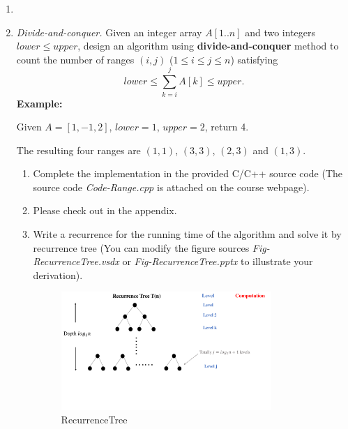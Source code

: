 \documentclass[12pt,a4paper]{article}
\makeatletter
\newtheorem*{solution}{Solution}
\theoremstyle{definition}
\renewenvironment{solution}[1][Solution] {\par\pushQED{\qed}\normalfont\topsep6\p@\@plus6\p@\relax\trivlist\item[\hskip\labelsep\bfseries#1\@addpunct{.}]\ignorespaces}{\popQED\endtrivlist\@endpefalse} \makeatother
\makeatother
\begin{document}
\begin{enumerate}
\begin{solution}
	
\end{solution}
\item
\textit{Divide-and-conquer.} Given an integer array $A[1..n]$ and two integers $lower \le upper$, design an algorithm using \textbf{divide-and-conquer} method to count the number of ranges $(i,j)$ ($1 \leq i \leq j \leq n$) satisfying
$$
    lower \leq \sum_{k=i}^{j}{A[k]} \leq upper.
$$
\textbf{Example:}

Given $A = [1,-1,2]$, $lower = 1$, $upper = 2$, return 4.

The resulting four ranges are $(1,1)$, $(3,3)$, $(2,3)$ and $(1,3)$.

\begin{enumerate}
\item
Complete the implementation in the provided C/C++ source code {\color{blue}(The source code \emph{Code-Range.cpp} is attached on the course webpage)}.

\begin{solution}
Please check out in the appendix.
\end{solution}

\item
Write a recurrence for the running time of the algorithm and solve it by recurrence tree {\color{blue}(You can modify the figure sources \emph{Fig-RecurrenceTree.vsdx} or \emph{Fig-RecurrenceTree.pptx} to illustrate your derivation)}.


\begin{figure}[the]
    \centering
    \includegraphics[width=0.8\textwidth]{Fig-RecurrenceTree2.pdf}
    \caption{RecurrenceTree}\label{Fig-Transposition}
\end{figure}


\end{enumerate}
\end{enumerate}
\end{document}

